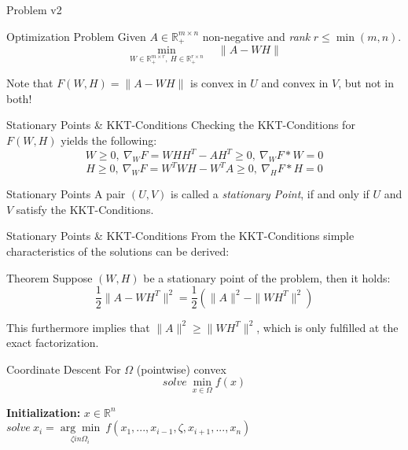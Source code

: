 \documentclass[aspectratio=169]{beamer}
\begin{document}
\begin{frame}{Problem v2}
    \begin{block}{Optimization Problem}
            Given \(A \in \mathbb{R}^{m \times n}_+\) non-negative and \emph{rank} \(r \leq \min(m, n)\). \\
            \[ \min_{W \in \mathbb{R}^{m \times r}_+, \ H \in \mathbb{R}^{r \times n}_+ } \quad  \| A - WH \| \]
    \end{block}
    Note that $F(W,H) = \|A - WH\|$ is convex in $U$ and convex in $V$, but not in both!
\end{frame}

\begin{frame}{Stationary Points \& KKT-Conditions}
    Checking the KKT-Conditions for \(F(W,H) \) yields the following:
        \[ W \geq 0, \ \nabla_W F = WHH^T - AH^T \geq 0, \ \nabla_W F * W = 0 \]
        \[ H \geq 0, \ \nabla_W F = W^T WH - W^T A \geq 0, \ \nabla_H F * H = 0 \]

    \begin{block}{Stationary Points}
        A pair \((U,V)\) is called a \emph{stationary Point}, if and only if \(U\) and \(V\) satisfy the KKT-Conditions.
    \end{block}
    
\end{frame}

\begin{frame}{Stationary Points \& KKT-Conditions}
    From the KKT-Conditions simple characteristics of the solutions can be derived:
    \begin{block}{Theorem}
        Suppose \( (W,H)\) be a stationary point of the problem, then it holds:
        \[ \frac{1}{2} \|A - WH^T\|^2 = \frac{1}{2} (\|A\|^2 - \|WH^T\|^2 )\]
    \end{block}
    This furthermore implies that \( \|A\|^2 \geq \|WH^T\|^2\), which is only fulfilled at the exact factorization.
\end{frame}

\begin{frame}{Coordinate Descent}
    For $\Omega$ (pointwise) convex \[solve \ \min_{x \in \Omega} f(x) \]
    
    \begin{algorithm}[H]
    \caption{General Coordinate Descent}
        \textbf{Initialization:} \(x \in \mathbb{R}^n\) \\
         {$solve \ x_i = \underset{\zeta in \Omega_i}{\arg \min} \ f(x_1, ..., x_{i-1}, \zeta, x_{i+1}, ..., x_n)$}
    \end{algorithm}
\end{frame}
\end{document}
